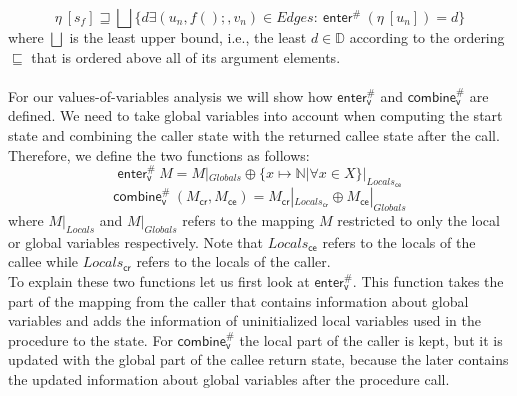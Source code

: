     \[\eta\ [s_f] \sqsupseteq \bigsqcup \{ d \exists (u_n, f();, v_n) \in Edges:\ \textsf{enter}^{\#}\ (\eta\ [u_n]) = d \}\]
    where $\bigsqcup$ is the least upper bound, i.e., the least $d \in \mathbb{D}$ according to the ordering $\sqsubseteq$ that is ordered above all of its argument elements.\\
    \\
    For our values-of-variables analysis we will show how $\textsf{enter}^{\#}_\textsf{v}$ and $\textsf{combine}^{\#}_\textsf{v}$ are defined. We need to take global variables into account when computing the start state and combining the caller state with the returned callee state after the call. Therefore, we define the two functions as follows:
    \[\textsf{enter}^{\#}_\textsf{v}\ M = M|_{Globals} \oplus \{x \mapsto \mathbb{N} | \forall x \in X\}|_{Locals_\textsf{ce}} \]
    \[\textsf{combine}^{\#}_\textsf{v}\ (M_\textsf{cr}, M_\textsf{ce}) = M_\textsf{cr}|_{Locals_\textsf{cr}} \oplus M_\textsf{ce}|_{Globals} \]
    where $M|_{Locals}$ and $M|_{Globals}$ refers to the mapping $M$ restricted to only the local or global variables respectively. Note that $Locals_\textsf{ce}$ refers to the locals of the callee while $Locals_\textsf{cr}$ refers to the locals of the caller.\\
    To explain these two functions let us first look at $\textsf{enter}^{\#}_\textsf{v}$. This function takes the part of the mapping from the caller that contains information about global variables and adds the information of uninitialized local variables used in the procedure to the state. For $\textsf{combine}^{\#}_\textsf{v}$ the local part of the caller is kept, but it is updated with the global part of the callee return state, because the later contains the updated information about global variables after the procedure call.\\

